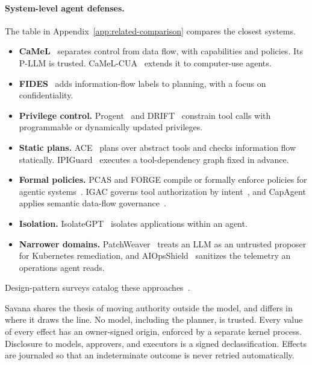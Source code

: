\documentclass[letterpaper,twocolumn,10pt]{article}
\newcommand{\sys}{Savana}
\begin{document}
\paragraph{System-level agent defenses.} The table in
Appendix~\ref{app:related-comparison} compares the closest systems.
\begin{itemize}
\item \textbf{CaMeL}~\cite{debenedetti2025camel} separates control from
  data flow, with capabilities and policies. Its P-LLM is trusted.
  CaMeL-CUA~\cite{foerster2026camelcua} extends it to computer-use agents.
\item \textbf{FIDES}~\cite{costa2025fides} adds information-flow labels
  to planning, with a focus on confidentiality.
\item \textbf{Privilege control.} Progent~\cite{shi2025progent} and
  DRIFT~\cite{li2025drift} constrain tool calls with programmable or
  dynamically updated privileges.
\item \textbf{Static plans.} ACE~\cite{ace2026} plans over abstract tools
  and checks information flow statically. IPIGuard~\cite{ipiguard2025}
  executes a tool-dependency graph fixed in advance.
\item \textbf{Formal policies.} PCAS and FORGE compile or formally enforce
  policies for agentic systems~\cite{palumbo2026pcas,palumbo2026forge}.
  IGAC governs tool authorization by intent~\cite{zhu2026igac}, and
  CapAgent applies semantic data-flow governance~\cite{hou2026capagent}.
\item \textbf{Isolation.} IsolateGPT~\cite{wu2025isolategpt} isolates
  applications within an agent.
\item \textbf{Narrower domains.} PatchWeaver~\cite{li2026patchweaver}
  treats an LLM as an untrusted proposer for Kubernetes remediation, and
  AIOpsShield~\cite{pasquini2026aiops} sanitizes the telemetry an
  operations agent reads.
\end{itemize}
Design-pattern surveys catalog these
approaches~\cite{beurerkellner2025patterns,willison2025trifecta,kim2026agentic}.

\sys{} shares the thesis of moving authority outside the model, and
differs in where it draws the line. No model, including the planner, is
trusted. Every value of every effect has an owner-signed origin, enforced
by a separate kernel process. Disclosure to models, approvers, and
executors is a signed declassification. Effects are journaled so that an
indeterminate outcome is never retried automatically.
\end{document}
